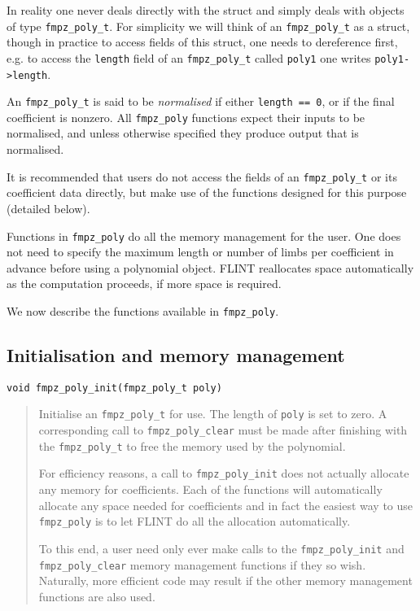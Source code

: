 \documentclass[a4paper,10pt]{article}
\newcommand{\code}{\lstinline}
\begin{document}
In reality one never deals directly with the struct and simply deals with objects of type \code{fmpz_poly_t}. For simplicity we will think of an \code{fmpz_poly_t} as a struct, though in practice to access fields of this struct, one needs to dereference first, e.g. to access the \code{length} field of an \code{fmpz_poly_t} called \code{poly1} one writes \code{poly1->length}. 

An \code{fmpz_poly_t} is said to be \emph{normalised} if either \code{length == 0}, or if the final coefficient is nonzero. All \code{fmpz_poly} functions expect their inputs to be normalised, and unless otherwise specified they produce output that is normalised. 

It is recommended that users do not access the fields of an \code{fmpz_poly_t} or its coefficient data directly, but make use of the functions designed for this purpose (detailed below).

Functions in \code{fmpz_poly} do all the memory management for the user. One does not need to specify the maximum length or number of limbs per coefficient in advance before using a polynomial object. FLINT reallocates space automatically as the computation proceeds, if more space is required. 

We now describe the functions available in \code{fmpz_poly}.

\subsection{Initialisation and memory management}

\begin{lstlisting}
void fmpz_poly_init(fmpz_poly_t poly)
\end{lstlisting}
\begin{quote}
Initialise an \code{fmpz_poly_t} for use. The length of \code{poly} is set to zero. A corresponding call to \code{fmpz_poly_clear} must be made after finishing with the \code{fmpz_poly_t} to free the memory used by the polynomial.

For efficiency reasons, a call to \code{fmpz_poly_init} does not actually allocate any memory for coefficients. Each of the functions will automatically allocate any space needed for coefficients and in fact the easiest way to use \code{fmpz_poly} is to let FLINT do all the allocation automatically. 

To this end, a user need only ever make calls to the \code{fmpz_poly_init} and \code{fmpz_poly_clear} memory management functions if they so wish. Naturally, more efficient code may result if the other memory management functions are also used.
\end{quote}
\end{document}
